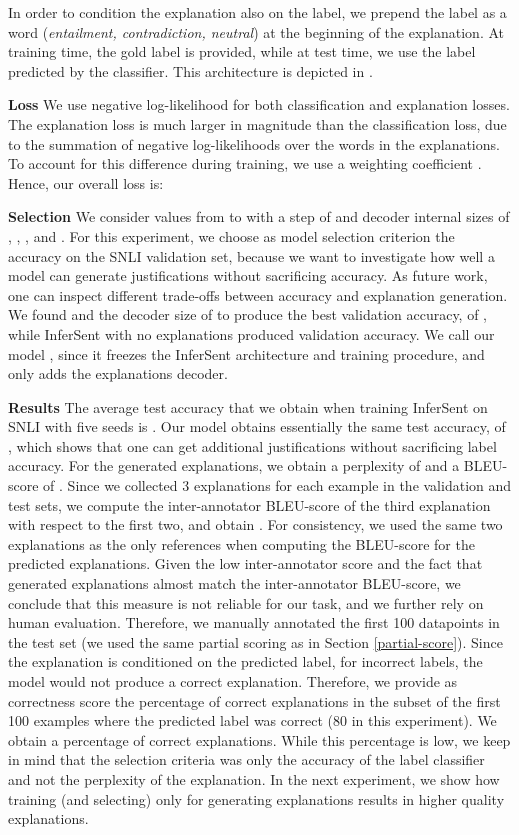 In order to condition the explanation also on the label, we prepend the label as a word (\textit{entailment, contradiction, neutral}) at the beginning of the explanation. At training time, the gold label is provided, while at test time, we use the label predicted by the classifier. 
This architecture is depicted in . 


\textbf{Loss   } We use negative log-likelihood for both classification and explanation losses. The explanation loss is much larger in magnitude than the classification loss, due to the summation of negative log-likelihoods over the words in the explanations. To account for this difference during training, we use a weighting coefficient . Hence, our overall loss is: 


\textbf{Selection   } We consider  values from  to  with a step of  and decoder internal sizes of , , , and . For this experiment, we choose as model selection criterion the accuracy on the SNLI validation set, because we want to investigate how well a model can generate justifications without sacrificing accuracy. As future work, one can inspect different trade-offs between accuracy and explanation generation. We found  and the decoder size of  to produce the best validation accuracy, of , while InferSent with no explanations produced  validation accuracy. We call our model \eInferSent{}, since it freezes the InferSent architecture and training procedure, and only adds the explanations decoder.

\textbf{Results   }
The average test accuracy that we obtain when training InferSent\cite{infersent} on SNLI with five seeds is   . Our \eInferSent{} model obtains essentially the same test accuracy, of  , which shows that one can get additional justifications without sacrificing label accuracy. For the generated explanations, we obtain a perplexity of  and a BLEU-score of . Since we collected 3 explanations for each example in the validation and test sets, we compute the inter-annotator BLEU-score of the third explanation with respect to the first two, and obtain . For consistency, we used the same two explanations as the only references when computing the BLEU-score for the predicted explanations. Given the low inter-annotator score and the fact that generated explanations almost match the inter-annotator BLEU-score, we conclude that this measure is not reliable for our task, and we further rely on human evaluation. Therefore, we manually annotated the first 100 datapoints in the test set (we used the same partial scoring as in Section \ref{partial-score}). Since the explanation is conditioned on the predicted label, for incorrect labels, the model would not produce a correct explanation. Therefore, we provide as correctness score the percentage of correct explanations in the subset of the first 100 examples where the predicted label was correct (80 in this experiment). We obtain a percentage of  correct explanations. While this percentage is low, we keep in mind that the selection criteria was only the accuracy of the label classifier and not the perplexity of the explanation. In the next experiment, we show how training (and selecting) only for generating explanations results in higher quality explanations.

